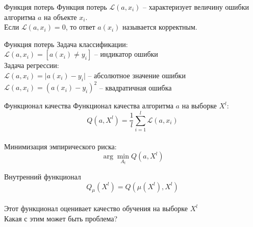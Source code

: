 \documentclass[10pt]{beamer}
\begin{document}
{
\begin{frame}{Функция потерь}
  Функция потерь $\mathcal{L}(a, x_i) $ -- характеризует величину ошибки алгоритма $a$ на объекте $x_i$.\\
  \bigbreak
  Если $\mathcal{L} (a, x_i) = 0$, то ответ $a(x_i)$ называется корректным.
\end{frame}
}

{
\begin{frame}{Функция потерь}
  Задача классификации:\\
  $\mathcal{L}(a, x_i) = [a(x_i) \neq y_i]$ -- индикатор ошибки\\
  \bigbreak
  Задача регрессии:\\
  $\mathcal{L}(a, x_i) = \vert a(x_i) - y_i \vert$ -- абсолютное значение ошибки\\
  $\mathcal{L}(a, x_i) = (a(x_i) - y_i)^2$ -- квадратичная ошибка\\
\end{frame}
}

{
\begin{frame}{Функционал качества}
  Функционал качества алгоритма $a$ на выборке $X^l$:\\
  $$Q(a, X^l) = \frac{1}{l} \sum\limits_{i=1}^l \mathcal{L}(a, x_i)$$\\
  Минимизация эмпирического риска:\\
  $$\arg\min\limits_{A_t} Q(a, X^l)$$
\end{frame}
}

\begin{frame}{Внутренний функционал}  
  $$Q_{\mu}(X^l) = Q(\mu(X^l), X^l)$$\\
  \bigbreak
  Этот функционал оценивает качество обучения на выборке $X^l$\\
  \bigbreak
  \pause
  Какая с этим может быть проблема?
\end{frame}

%
\end{document}
